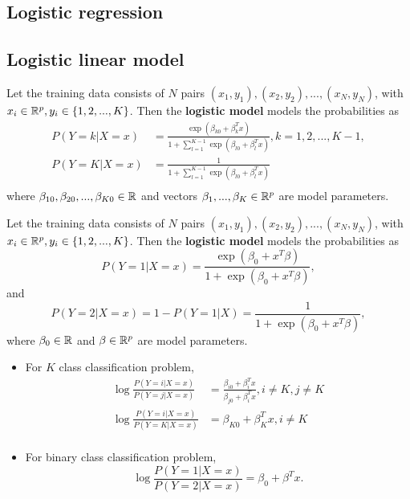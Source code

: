 \begin{refsection}
\section{Logistic regression}


\subsection{Logistic linear model}


\begin{definition}
	Let the training data consists of $N$ pairs $(x_1,y_1),(x_2,y_2),...,(x_N,y_N)$, with $x_i \in \mathbb{R}^{p}, y_i \in \{1,2,...,K\}$. Then the \textbf{logistic model} models the probabilities as
	\begin{align*}
	P(Y = k|X=x) &= \frac{\exp(\beta_{k0} + \beta_k^Tx)}{1 + \sum_{l=1}^{K-1}\exp(\beta_{l0}+\beta_l^Tx)}, k=1,2,...,K-1, \\
	P(Y = K|X=x) &= \frac{1}{1 + \sum_{l=1}^{K-1}\exp(\beta_{l0}+\beta_l^Tx)} \\
	\end{align*}
	where $\beta_{10},\beta_{20},...,\beta_{K0} \in \mathbb{R}$ and vectors $\beta_1,...,\beta_K\in\mathbb{R}^p$ are model parameters.
\end{definition}


\begin{definition}
	Let the training data consists of $N$ pairs $(x_1,y_1),(x_2,y_2),...,(x_N,y_N)$, with $x_i \in \mathbb{R}^{p}, y_i \in \{1,2,...,K\}$. Then the \textbf{logistic model} models the probabilities as
	$$P(Y=1|X=x) = \frac{\exp(\beta_0 + x^T\beta)}{1 + \exp(\beta_0 + x^T\beta)},$$
	and
	$$P(Y=2|X=x) = 1- P(Y=1|X) = \frac{1}{1 + \exp(\beta_0 + x^T\beta)},$$ 
	where $\beta_0 \in \mathbb{R}$ and $\beta\in\mathbb{R}^p$ are model parameters.
\end{definition}


\begin{remark}\hfill
\begin{itemize}
	\item For $K$ class classification problem,
	\begin{align*}
	\log \frac{P(Y = i|X=x)}{P(Y = j|X=x)} &= \frac{\beta_{i0} + \beta_i^Tx}{\beta_{j0} + \beta_i^Tx}, i\neq K, j\neq K \\
	\log \frac{P(Y = i|X=x)}{P(Y = K|X=x)} &= \beta_{K0} + \beta_K^Tx, i\neq K \\
	\end{align*}
	\item For binary class classification problem,
	$$\log \frac{P(Y = 1|X=x)}{P(Y = 2|X=x)} = \beta_{0} + \beta^Tx.$$
\end{itemize}	
\end{remark}



\end{refsection}
